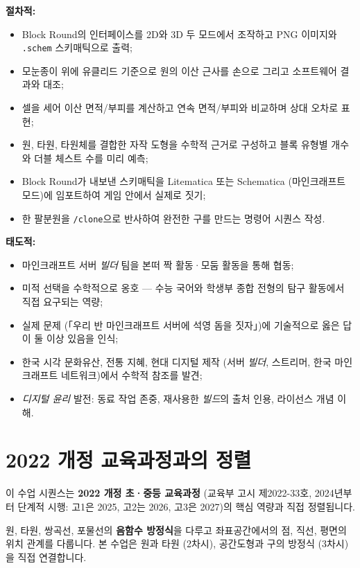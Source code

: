 \documentclass[12pt,a4paper]{scrartcl}
\newcommand{\acc}[1]{\textcolor{accent}{\textbf{#1}}}
\newcommand{\cmd}[1]{\textcolor{earth}{\texttt{\small #1}}}
\begin{document}
\textbf{절차적:}
\begin{itemize}[leftmargin=1.3em,itemsep=0.2em,topsep=0.3em]
  \item Block Round의 인터페이스를 2D와 3D 두 모드에서 조작하고 PNG 이미지와 \texttt{.schem} 스키매틱으로 출력;
  \item 모눈종이 위에 유클리드 기준으로 원의 이산 근사를 손으로 그리고 소프트웨어 결과와 대조;
  \item 셀을 세어 이산 면적/부피를 계산하고 연속 면적/부피와 비교하며 상대 오차로 표현;
  \item 원, 타원, 타원체를 결합한 자작 도형을 수학적 근거로 구성하고 블록 유형별 개수와 더블 체스트 수를 미리 예측;
  \item Block Round가 내보낸 스키매틱을 Litematica 또는 Schematica (마인크래프트 모드)에 임포트하여 게임 안에서 실제로 짓기;
  \item 한 팔분원을 \cmd{/clone}으로 반사하여 완전한 구를 만드는 명령어 시퀀스 작성.
\end{itemize}

\textbf{태도적:}
\begin{itemize}[leftmargin=1.3em,itemsep=0.2em,topsep=0.3em]
  \item 마인크래프트 서버 \emph{빌더} 팀을 본떠 짝 활동·모둠 활동을 통해 협동;
  \item 미적 선택을 수학적으로 옹호 --- 수능 국어와 학생부 종합 전형의 탐구 활동에서 직접 요구되는 역량;
  \item 실제 문제 (「우리 반 마인크래프트 서버에 석영 돔을 짓자」)에 기술적으로 옳은 답이 둘 이상 있음을 인식;
  \item 한국 시각 문화유산, 전통 지혜, 현대 디지털 제작 (서버 \emph{빌더}, 스트리머, 한국 마인크래프트 네트워크)에서 수학적 참조를 발견;
  \item \emph{디지털 윤리} 발전: 동료 작업 존중, 재사용한 \emph{빌드}의 출처 인용, 라이선스 개념 이해.
\end{itemize}

\section{2022 개정 교육과정과의 정렬}\label{sec:curriculum}

이 수업 시퀀스는 \acc{2022 개정 초·중등 교육과정} (교육부 고시 제2022-33호, 2024년부터 단계적 시행: 고1은 2025, 고2는 2026, 고3은 2027)의 핵심 역량과 직접 정렬됩니다.

\begin{pyojun}[기하 --- 일반선택]
원, 타원, 쌍곡선, 포물선의 \acc{음함수 방정식}을 다루고 좌표공간에서의 점, 직선, 평면의 위치 관계를 다룹니다. 본 수업은 원과 타원 (2차시), 공간도형과 구의 방정식 (3차시)을 직접 연결합니다.
\end{pyojun}
\end{document}
